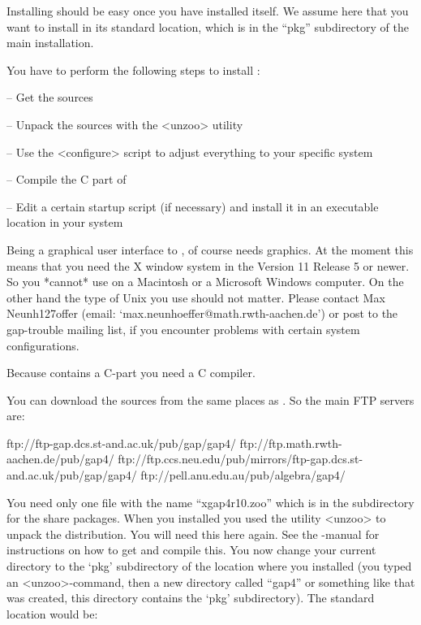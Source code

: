 
Installing {\XGAP} should be easy once you have installed {\GAP} itself. We
assume here that you want to install {\XGAP} in its standard location,
which is in the ``pkg'' subdirectory of the main {} installation.


You have to perform the following steps to install {\XGAP}:

\beginlist
\item{--} Get the sources
\item{--} Unpack the sources with the <unzoo> utility
\item{--} Use the <configure> script to adjust everything to your specific
  system
\item{--} Compile the C part of {\XGAP}
\item{--} Edit a certain startup script (if necessary) and install it in 
      an executable location in your system
\endlist


Being a graphical user interface to {\GAP}, {\XGAP} of course needs
graphics. At the moment this means that you need the X window system in the 
Version 11 Release 5 or newer. So you *cannot* use {\XGAP} on a Macintosh
or a Microsoft Windows computer. On the other hand the type of Unix you use 
should not matter. Please contact Max Neunh\accent127offer (email:
`max.neunhoeffer@math.rwth-aachen.de') or post to the gap-trouble  
mailing list, if you encounter problems with certain system configurations.

Because {\XGAP} contains a C-part you need a C compiler.


You can download the sources from the same places as {\GAP}. So the main
FTP servers are:

\begintt
ftp://ftp-gap.dcs.st-and.ac.uk/pub/gap/gap4/
ftp://ftp.math.rwth-aachen.de/pub/gap4/
ftp://ftp.ccs.neu.edu/pub/mirrors/ftp-gap.dcs.st-and.ac.uk/pub/gap/gap4/
ftp://pell.anu.edu.au/pub/algebra/gap4/
\endtt

You need only one file with the name ``xgap4r10.zoo''
which is in the subdirectory for the share packages.
When you installed {\GAP} you used the utility <unzoo> to unpack the
distribution. You will need this here again. See the {\GAP}-manual for
instructions on how to get and compile this.
You now change your current directory to the `pkg' subdirectory of the 
location where you installed
{\GAP} (you typed an <unzoo>-command, then a new directory called
``gap4'' or something like that was created, this directory contains
the `pkg' subdirectory). The standard location would be:

